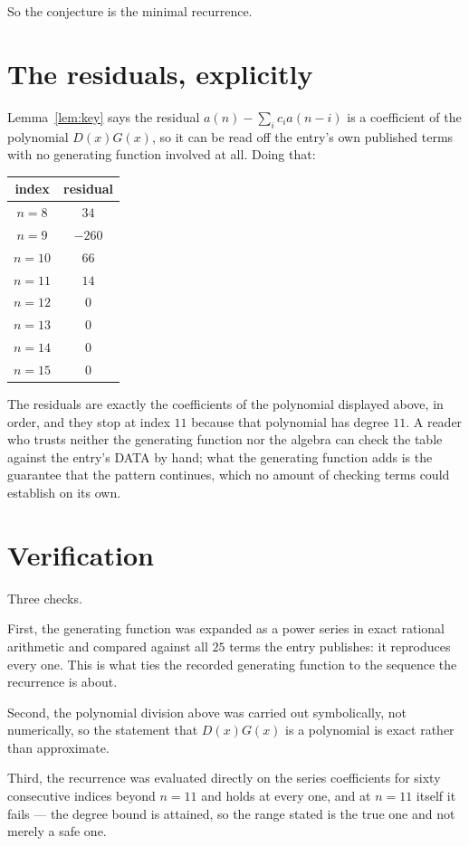 \documentclass[11pt,a4paper]{article}
\theoremstyle{plain}
\theoremstyle{definition}
\begin{document}
So the conjecture is the minimal recurrence.

\section{The residuals, explicitly}

Lemma~\ref{lem:key} says the residual $a(n)-\sum_ic_ia(n-i)$ is a coefficient of the
polynomial $D(x)G(x)$, so it can be read off the entry's own published terms with no
generating function involved at all. Doing that:
\begin{center}
\begin{tabular}{cc}
index & residual \\ \hline
$n=8$ & $34$ \\
$n=9$ & $-260$ \\
$n=10$ & $66$ \\
$n=11$ & $14$ \\
$n=12$ & $0$ \\
$n=13$ & $0$ \\
$n=14$ & $0$ \\
$n=15$ & $0$
\end{tabular}
\end{center}
The residuals are exactly the coefficients of the polynomial displayed above, in order, and
they stop at index $11$ because that polynomial has degree $11$. A reader who trusts
neither the generating function nor the algebra can check the table against the entry's DATA
by hand; what the generating function adds is the guarantee that the pattern continues, which
no amount of checking terms could establish on its own.

\section{Verification}

Three checks.

First, the generating function was expanded as a power series in exact rational arithmetic and
compared against all $25$ terms the entry publishes: it reproduces every one. This is
what ties the recorded generating function to the sequence the recurrence is about.

Second, the polynomial division above was carried out symbolically, not numerically, so the
statement that $D(x)G(x)$ is a polynomial is exact rather than approximate.

Third, the recurrence was evaluated directly on the series coefficients for sixty consecutive
indices beyond $n=11$ and holds at every one, and at $n=11$ itself it fails --- the
degree bound is attained, so the range stated is the true one and not merely a safe one.
\end{document}
